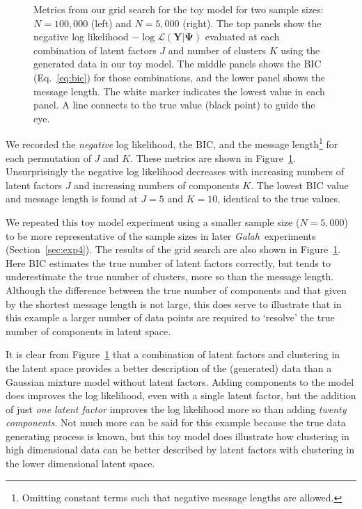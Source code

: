 \documentclass[twocolumn]{aastex62}
\newcommand{\project}[1]{\textsl{#1}}
\newcommand{\Galah}{\project{Galah}}
\newcommand{\vect}[1]{\boldsymbol{\mathbf{#1}}}
\renewcommand{\vec}[1]{\vect{#1}}
\newcommand{\data}{\textbf{Y}}
\newcommand{\NumLatentFactors}{J}
\newcommand{\NumComponents}{K}
\begin{document}
\begin{figure}
\begin{tabular}[b]{@{}p{}@{}}
	\end{tabular}
    \caption{Metrics from our grid search for the toy model for two sample sizes: 
    		 $N = 100,000$ (left) and $N = 5,000$ (right). 
    		 The top panels show the negative log likelihood
			 $-\log{\mathcal{L}\left(\data|\vec\Psi\right)}$ 
			 evaluated at each combination of latent factors 
			 $\NumLatentFactors$ and number of clusters 
			 $\NumComponents$ using the generated data in our toy model.
			 The middle panels shows 
			 the BIC (Eq.~\ref{eq:bic}) for those 
			 combinations, and the lower panel shows the 
			 message length. The white marker indicates the
			 lowest value in each panel. A line connects to the true value (black point) to guide the eye.}
    \label{fig:experiment-1-gridsearch}
    \vspace{-10em}
\end{figure}



We recorded the \emph{negative} log likelihood, the BIC, and the message length\footnote{Omitting constant terms such that negative message lengths are allowed.}  for each permutation of $\NumLatentFactors$ and $\NumComponents$.
These metrics are shown in Figure~\ref{fig:experiment-1-gridsearch}.
Unsurprisingly the negative log likelihood decreases with increasing numbers of latent
factors $\NumLatentFactors$ and increasing numbers of components $\NumComponents$.
The lowest BIC value and message length is found at $\NumLatentFactors = 5$
and $\NumComponents = 10$, identical to the true values. 

We repeated this toy model experiment using a smaller sample size ($N = 5,000$) to be more representative of the sample sizes in later \Galah\ experiments (Section~\ref{sec:exp4}). The results of the grid search are also shown in Figure~\ref{fig:experiment-1-gridsearch}. Here BIC estimates the true number of latent factors correctly, but tends to underestimate the true number of clusters, more so than the message length. Although the difference between the true number of components and that given by the shortest message length is not large, this does serve to illustrate that in this example a larger number of data points are required to `resolve' the true number of components in latent space.


It is clear from Figure~\ref{fig:experiment-1-gridsearch} that a combination of latent factors
and clustering in the latent space provides a better description of the (generated) data than a Gaussian mixture model without latent factors.
Adding components to the model does improves the log likelihood, even with a single latent factor,
but the addition of just \emph{one latent factor} improves the log likelihood more so than adding
\emph{twenty components}. Not much more can be said for this example because the true data generating process 
is known, but this toy model does illustrate how 
clustering in high dimensional data can be better described by latent factors with 
clustering in the lower dimensional latent space.
\end{document}
